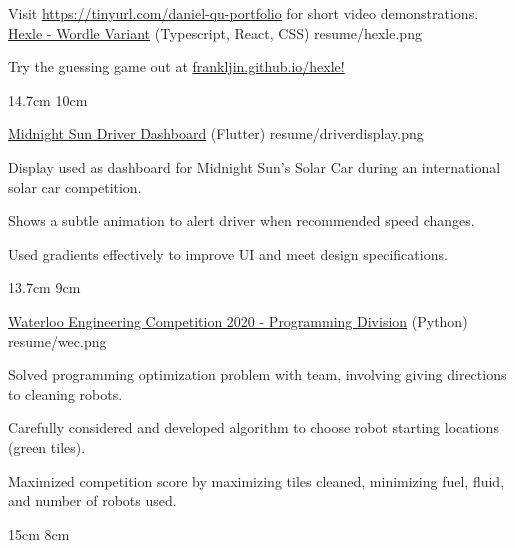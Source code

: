 

\begin{cventries}

  Visit \href{https://tinyurl.com/daniel-qu-portfolio}{\underline{https://tinyurl.com/daniel-qu-portfolio}} for short video demonstrations.
  \\%
  \portfolioEntry
    {\href{https://frankljin.github.io/hexle/}{Hexle - Wordle Variant} (Typescript, React, CSS)} %
    {resume/hexle.png} %
    {
      \begin{cvitems} %
        \item {Try the guessing game out at \href{https://frankljin.github.io/hexle/}{\underline{frankljin.github.io/hexle}!}}
      \end{cvitems}
    }
    {14.7cm}
    {10cm}

  \portfolioEntry
    {\href{https://github.com/uw-midsun/telemetry_xiv}{Midnight Sun Driver Dashboard} (Flutter)} %
    {resume/driverdisplay.png} %
    {
      \begin{cvitems} %
        \item {Display used as dashboard for Midnight Sun's Solar Car during an international solar car competition.}
        \item {Shows a subtle animation to alert driver when recommended speed changes.}
        \item {Used gradients effectively to improve UI and meet design specifications.}
      \end{cvitems}
    }
    {13.7cm}
    {9cm}

  \newpage

  \portfolioEntry
    {\href{https://github.com/danielq987/WECF2020}{Waterloo Engineering Competition 2020 - Programming Division} (Python)} %
    {resume/wec.png} %
    {
      \begin{cvitems} %
        \item {Solved programming optimization problem with team, involving giving directions to cleaning robots.}
        \item {Carefully considered and developed algorithm to choose robot starting locations (green tiles).}
        \item {Maximized competition score by maximizing tiles cleaned, minimizing fuel, fluid, and number of robots used.}
      \end{cvitems}
    }
    {15cm}
    {8cm}
  


\end{cventries}
